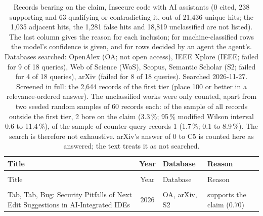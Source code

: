 
\begingroup\footnotesize
\begin{longtable}{@{}%
  >{\raggedright\arraybackslash}p{}c%
  >{\raggedright\arraybackslash}p{}%
  >{\raggedright\arraybackslash}p{}@{}}
\caption{Records bearing on the claim, Insecure code with AI assistants (0 cited, 238 supporting and 63 qualifying or contradicting it, out of 21,436 unique hits; the 1,035 adjacent hits, the 1,281 false hits and 18,819 unclassified are not listed). The last column gives the reason for each inclusion; for machine-classified rows the model's confidence is given, and for rows decided by an agent the agent's. Databases searched: OpenAlex (OA; not open access), IEEE Xplore (IEEE; failed for 9 of 18 queries), Web of Science (WoS), Scopus, Semantic Scholar (S2; failed for 4 of 18 queries), arXiv (failed for 8 of 18 queries). Searched 2026-11-27. Screened in full: the 2,644 records of the first tier (place 100 or better in a relevance-ordered answer). The unclassified works were only counted, apart from two seeded random samples of 60 records each: of the sample of all records outside the first tier, 2 bore on the claim (3.3\,\%; 95\,\% modified Wilson interval 0.6 to 11.4\,\%), of the sample of counter-query records 1 (1.7\,\%; 0.1 to 8.9\,\%). The search is therefore not exhaustive. arXiv's answer of 0 to C5 is counted here as answered; the text treats it as not searched.}\label{tab:insecure-code}\\
\toprule
Title & Year & Database & Reason \\
\midrule
\endfirsthead
\multicolumn{4}{@{}l}{\emph{\tablename~\thetable{} (cont.)}}\\
\toprule
Title & Year & Database & Reason \\
\midrule
\endhead
\midrule \multicolumn{4}{r@{}}{\emph{continued on next page}}\\
\endfoot
\bottomrule
\endlastfoot
\textquotedbl{}Tab, Tab, Bug\textquotedbl{}: Security Pitfalls of Next Edit Suggestions in AI-Integrated IDEs & 2026 & OA, arXiv, S2 & supports the claim (0.70) \\

\end{longtable}
